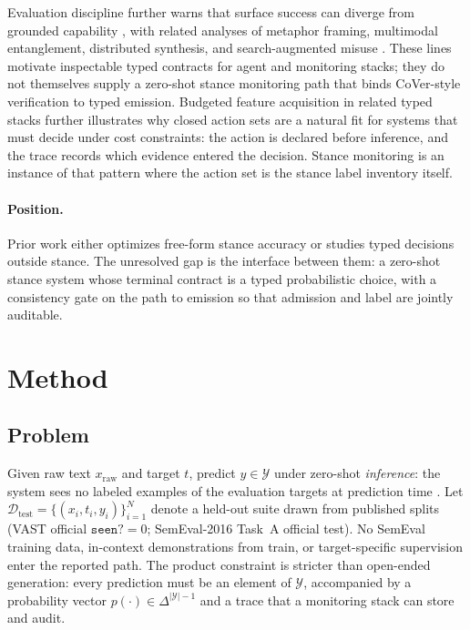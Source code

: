 \documentclass[10pt]{article}
\theoremstyle{definition}
\begin{document}
Evaluation discipline further warns that surface success can diverge from grounded capability
\cite{souly2024strongreject,yan2025confusion}, with related analyses of metaphor framing, multimodal
entanglement, distributed synthesis, and search-augmented misuse
\cite{yan2025benign,yan2026red,yan2025poisonswarm,yan2026searchattack}.
These lines motivate inspectable typed contracts for agent and monitoring stacks; they do not themselves
supply a zero-shot stance monitoring path that binds CoVer-style verification to typed emission.
Budgeted feature acquisition in related typed stacks \cite{jevforest2026} further illustrates why closed
action sets are a natural fit for systems that must decide under cost constraints: the action is declared
before inference, and the trace records which evidence entered the decision.
Stance monitoring is an instance of that pattern where the action set is the stance label inventory itself.

\paragraph{Position.}
Prior work either optimizes free-form stance accuracy or studies typed decisions outside stance.
The unresolved gap is the interface between them: a zero-shot stance system whose terminal contract is a
typed probabilistic choice, with a consistency gate on the path to emission so that admission and label are
jointly auditable.

\section{Method}
\label{sec:method}

\subsection{Problem}
\label{sec:problem}
Given raw text $x_{\mathrm{raw}}$ and target $t$, predict $y\in\mathcal{Y}$ under zero-shot
\emph{inference}: the system sees no labeled examples of the evaluation targets at prediction time
\cite{allaway2020vast,yan2025cover}.
Let $\mathcal{D}_{\mathrm{test}}=\{(x_i,t_i,y_i)\}_{i=1}^{N}$ denote a held-out suite drawn from published
splits (VAST official $\texttt{seen?}{=}0$; SemEval-2016 Task~A official test).
No SemEval training data, in-context demonstrations from train, or target-specific supervision enter the
reported path.
The product constraint is stricter than open-ended generation: every prediction must be an element of
$\mathcal{Y}$, accompanied by a probability vector $p(\cdot)\in\Delta^{|\mathcal{Y}|-1}$ and a trace that a
monitoring stack can store and audit.
\end{document}
